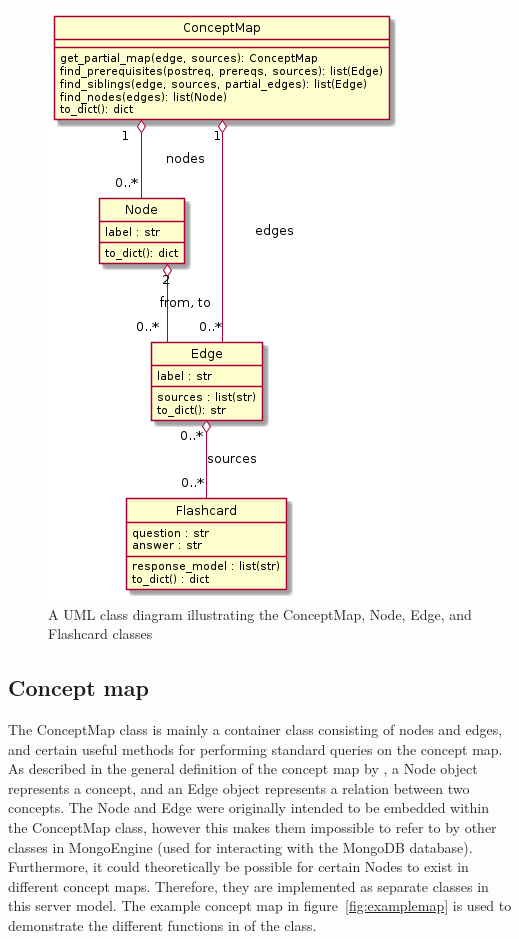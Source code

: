 \begin{figure}
    \centering
    \includegraphics[height=0.4\textheight]{img/classdiagram_concept_map.png}
    \caption{A UML class diagram illustrating the ConceptMap, Node, Edge, and Flashcard classes}
    \label{fig:classdiagram_concept_map}
\end{figure}

\subsection{Concept map}

The ConceptMap class is mainly a container class consisting of nodes and edges, and certain useful methods for performing standard queries on the concept map. As described in the general definition of the concept map by , a Node object represents a concept, and an Edge object represents a relation between two concepts. The Node and Edge were originally intended to be embedded within the ConceptMap class, however this makes them impossible to refer to by other classes in MongoEngine (used for interacting with the MongoDB database). Furthermore, it could theoretically be possible for certain Nodes to exist in different concept maps. Therefore, they are implemented as separate classes in this server model. The example concept map in figure~\ref{fig:examplemap} is used to demonstrate the different functions in of the class.

